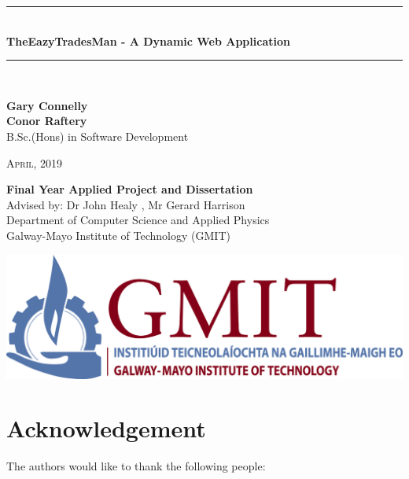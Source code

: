 \documentclass[12pt,a4paper,oneside,openany]{book}
\newcommand{\projecttitle}{TheEazyTradesMan - A Dynamic Web Application}
\newcommand{\projectauthor}{Gary Connelly \\[0.2cm] Conor Raftery}
\newcommand{\projectadvisor}{Dr John Healy , Mr Gerard Harrison}
\newcommand{\projectprogramme}{B.Sc.(Hons) in Software Development}
\newcommand{\projectdate}{April, 2019}
\begin{document}
  \begin{titlepage}
    \begin{minipage}[t][6cm]{\textwidth}
      \centering
      \rule{\linewidth}{0.5mm} \\[0.4cm]
      { \LARGE \bfseries \projecttitle \\[0.4cm] }
      \rule{\linewidth}{0.5mm} \\[0.8cm]
    \end{minipage}
    
    \begin{minipage}[t][6.5cm]{\textwidth}
      \centering
      \textbf{\projectauthor}\\[0.5cm]
      \projectprogramme
    \end{minipage}
  
    \begin{minipage}[t][1cm]{\textwidth}
      \centering
      \textsc{\projectdate}
    \end{minipage}
      
    \begin{minipage}[t][3cm]{\textwidth}
      \centering
      \textbf{Final Year Applied Project and Dissertation}\\[0.3cm]
      Advised by: \projectadvisor \\[0.1cm]
      Department of Computer Science and Applied Physics\\
      Galway-Mayo Institute of Technology (GMIT)
    \end{minipage}
  
    \begin{center}    
      \includegraphics{img/gmit-logo.jpg}
    \end{center}
  \end{titlepage}
  \setcounter{page}{2}
  
  \chapter*{Acknowledgement}
  
  The authors would like to thank the following people:
  
\end{document}
